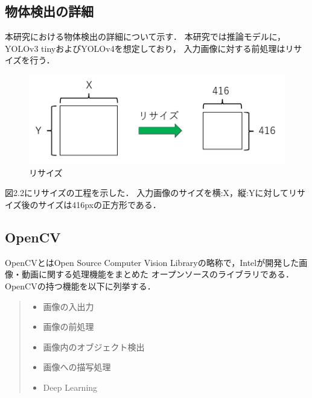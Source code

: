 \documentclass[11pt,a4j]{jreport}
\begin{document}
\subsection{物体検出の詳細}
本研究における物体検出の詳細について示す．
本研究では推論モデルに，YOLOv3 tinyおよびYOLOv4\cite{yolo}を想定しており，
入力画像に対する前処理はリサイズを行う．
\begin{figure}[H]
  \center
  \includegraphics[scale = 0.8]{pict/pict5.jpg}
  \caption{リサイズ}
\end{figure}
図2.2にリサイズの工程を示した．
入力画像のサイズを横:X，縦:Yに対してリサイズ後のサイズは416pxの正方形である．


\subsection{OpenCV}
OpenCVとはOpen Source Computer Vision Libraryの略称で，Intelが開発した画像・動画に関する処理機能をまとめた
オープンソースのライブラリである．OpenCVの持つ機能\cite{OpenCV}を以下に列挙する．
\begin{quote}
  \begin{itemize}
    \item 画像の入出力
    \item 画像の前処理
    \item 画像内のオブジェクト検出
    \item 画像への描写処理
    \item Deep Learning
  \end{itemize}
\end{quote}
\end{document}
